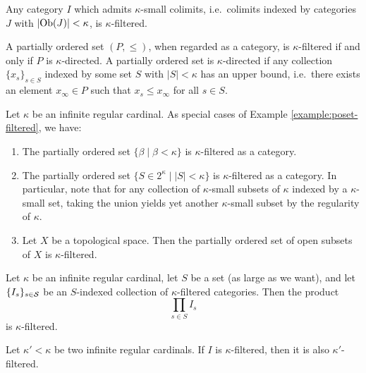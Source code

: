 \begin{example}
	Any category \( I\) which admits \(\kappa\)-small colimits, i.e.\ colimits indexed by categories \( J\) with \(|{\operatorname{Ob}( J)}| < \kappa\), is \(\kappa\)-filtered.
\end{example}
\begin{example}\label{example:poset-filtered}
	A partially ordered set \((P,\leq)\), when regarded as a category, is \(\kappa\)-filtered if and only if \(P\) is \(\kappa\)-directed. A partially ordered set is \(\kappa\)-directed
	if any collection \(\{ x_{s} \}_{s\in S}\) indexed by some set \(S\) with \(|S| < \kappa\) has an upper bound, i.e.\ there exists an element \(x_\infty\in P\) such that \(x_s \leq x_\infty\) for all \(s\in S\).
\end{example}
\begin{example}
	Let \(\kappa\) be an infinite regular cardinal. As special cases of Example \ref{example:poset-filtered}, we have:
	\begin{enumerate}[label=(\alph*)]
	\item The partially ordered set \(\{\beta \mid \beta < \kappa\}\) is \(\kappa\)-filtered as a category.
	\item The partially ordered set \(\{ S\in 2^\kappa \mid |S| < \kappa \}\) is \(\kappa\)-filtered as a category. In particular, note that for any collection of \(\kappa\)-small
	subsets of \(\kappa\) indexed by a \(\kappa\)-small set, taking the union yields yet another \(\kappa\)-small subset by the regularity of \(\kappa\).
	\item Let \(X\) be a topological space. Then the partially ordered set of open subsets of \(X\) is \(\kappa\)-filtered.
	\end{enumerate}
\end{example}
\begin{example}
	Let \(\kappa\) be an infinite regular cardinal, let \(S\) be a set (as large as we want), and let \(\{  I_s \}_{s\in\mathcal{S}}\) be an \(S\)-indexed collection
	of \(\kappa\)-filtered categories. Then the product
	\[ \prod_{s\in S} I_s \]
	is \(\kappa\)-filtered.
\end{example}
\begin{remark}\label{remark:filteredness-is-ordered}
	Let \(\kappa' < \kappa\) be two infinite regular cardinals. If \( I\) is \(\kappa\)-filtered, then it is also \(\kappa'\)-filtered.
\end{remark}

